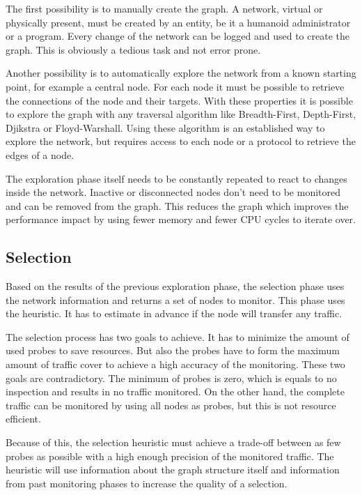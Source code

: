 \documentclass[thesis.tex]{subfiles}
\begin{document}
The first possibility is to manually create the graph. A network, virtual or physically present, must be created by an entity, be it a humanoid administrator or a program. Every change of the network can be logged and used to create the graph. This is obviously a tedious task and not error prone. 

Another possibility is to automatically explore the network from a known starting point, for example a central node. For each node it must be possible to retrieve the connections of the node and their targets. With these properties it is possible to explore the graph with any traversal algorithm like Breadth-First, Depth-First, Djikstra or Floyd-Warshall. \cite{Sedgewick.2011} Using these algorithm is an established way to explore the network, but requires access to each node or a protocol to retrieve the edges of a node.

The exploration phase itself needs to be constantly repeated to react to changes inside the network. Inactive or disconnected nodes don't need to be monitored and can be removed from the graph. This reduces the graph which improves the performance impact by using fewer memory and fewer CPU cycles to iterate over.

\subsection{Selection} \label{sec:main:selectionPhase}

Based on the results of the previous exploration phase, the selection phase uses the network information and returns a set of nodes to monitor. This phase uses the heuristic. It has to estimate in advance if the node will transfer any traffic.

The selection process has two goals to achieve. It has to minimize the amount of used probes to save resources. But also the probes have to form the maximum amount of traffic cover to achieve a high accuracy of the monitoring. These two goals are contradictory. The minimum of probes is zero, which is equals to no inspection and results in no traffic monitored. On the other hand, the complete traffic can be monitored by using all nodes as probes, but this is not resource efficient.

Because of this, the selection heuristic must achieve a trade-off between as few probes as possible with a high enough precision of the monitored traffic. The heuristic will use information about the graph structure itself and information from past monitoring phases to increase the quality of a selection.
\end{document}
